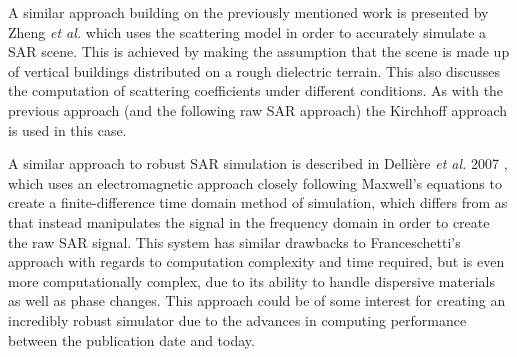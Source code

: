 A similar approach building on the previously mentioned work is presented by Zheng \textit{et al.} \cite{zhengSimulationMethodSAR2008} which uses the scattering model in order to accurately simulate a SAR scene. This is achieved by making the assumption that the scene is made up of vertical buildings distributed on a rough dielectric terrain. This also discusses the computation of scattering coefficients under different conditions. As with the previous approach (and the following raw SAR approach) the Kirchhoff approach is used in this case.
\par
A similar approach to robust SAR simulation is described in Dellière \textit{et al.} 2007 \cite{delliereSARMeasurementSimulation2007}, which uses an electromagnetic approach closely following Maxwell's equations to create a finite-difference time domain method of simulation, which differs from \cite{franceschettiSARRawSignal2003} as that instead manipulates the signal in the frequency domain in order to create the raw SAR signal. This system has similar drawbacks to Franceschetti's approach with regards to computation complexity and time required, but is even more computationally complex, due to its ability to handle dispersive materials as well as phase changes. This approach could be of some interest for creating an incredibly robust simulator due to the advances in computing performance between the publication date and today. \par
